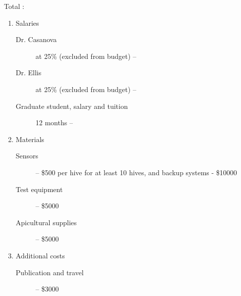 Total :
\begin{enumerate}
\item Salaries
\begin{description}
\item[Dr. Casanova] at 25\% (excluded from budget) -- 
\item[Dr. Ellis] at 25\% (excluded from budget)  -- 
\item[Graduate student, salary and tuition] 12 months --
\end{description}
\item Materials
\begin{description}
\item[Sensors] -- \$500 per hive for at least 10 hives, and backup systems - \$10000 
\item[Test equipment] -- \$5000 
\item[Apicultural supplies] -- \$5000
\end{description}
\item Additional costs
\begin{description}
\item[Publication and travel] -- \$3000
\end{description}
\end{enumerate}
